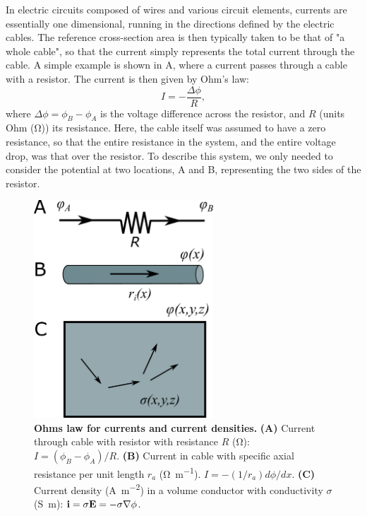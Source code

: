 In electric circuits composed of wires and various circuit elements, currents are essentially one dimensional, running in the directions defined by the electric cables. The reference cross-section area is then typically taken to be that of "a whole cable", so that the current simply represents the total current through the cable. A simple example is shown in A, where a current passes through a cable with a resistor. The current is then given by Ohm's law:
\begin{equation}
I = - \frac{\Delta \phi}{R}, 
\label{eq:Basics:Ohm_R}
\end{equation}
where $\Delta \phi = \phi_B-\phi_A$ is the voltage difference across the resistor, and $R$ (units Ohm (\si{\ohm})) its resistance. Here, the cable itself was assumed to have a zero resistance, so that the entire resistance in the system, and the entire voltage drop, was that over the resistor. To describe this system, we only needed to consider the potential at two locations, A and B, representing the two sides of the resistor. 

\begin{figure}[!ht]
\begin{center}
\includegraphics[width=0.6\textwidth]{Figures/Basics/Currents.png}
\end{center}
\caption{{\bf Ohms law for currents and current densities.} {\bf (A)} Current through cable with resistor with resistance $R$ (\si{\ohm}): $I = (\phi_B-\phi_A)/R$. {\bf (B)} Current in cable with specific axial resistance per unit length $r_a$ (\si{\ohm\per\metre}).  $I=- (1/r_a) d\phi/dx$. {\bf (C)} Current density (\si{\ampere\per\square\metre}) in a volume conductor with conductivity $\sigma$ (\si{\siemens\metre}): ${\bf i} = \sigma {\bf E} = - \sigma {\bf \nabla} \phi$.}
\label{fig:Basics:Currents}
\end{figure}

